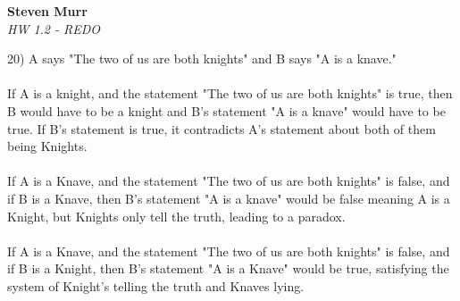 \documentclass{article}
\begin{document}
   \begin{flushright}
      \Large\textbf{Steven Murr}\\
      \large\textit{HW 1.2 - REDO}
   \end{flushright}
\begin{flushleft}
\setlength\parindent{0pt}20) A says "The two of us are both knights" and B says "A is a knave."
\\
~\\If A is a knight, and the statement "The two of us are both knights" is true, then B would have to be a knight and B's statement "A is a knave" would have to be true.  If B's statement is true, it contradicts A's statement about both of them being Knights.  \\

~\\If A is a Knave, and the statement "The two of us are both knights" is false, and if B is a Knave, then B's statement "A is a knave" would be false meaning A is a Knight, but Knights only tell the truth, leading to a paradox.\\
~\\
If A is a Knave, and the statement "The two of us are both knights" is false, and if B is a Knight, then B's statement "A is a Knave" would be true, satisfying the system of Knight's telling the truth and Knaves lying.
\end{flushleft}
\end{document}
